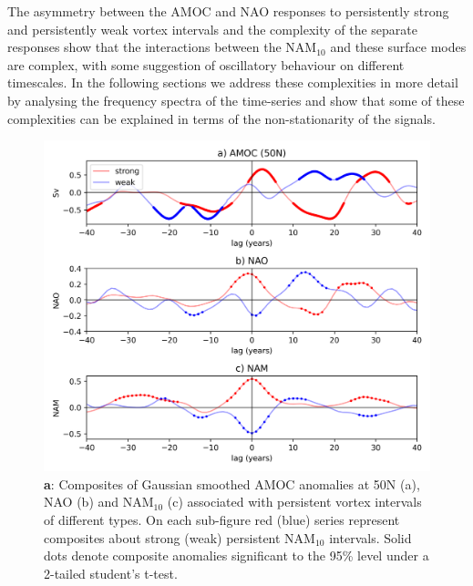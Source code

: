 The asymmetry between the AMOC and NAO responses to persistently strong and persistently weak vortex intervals and the complexity of the separate responses show that the interactions between the NAM$_{10}$ and these surface modes are complex, with some suggestion of oscillatory behaviour on different timescales. In the following sections we address these complexities in more detail by analysing the frequency spectra of the time-series and show that some of these complexities can be explained in terms of the non-stationarity of the signals.

\begin{figure}[h!]
\begin{center}
\noindent\includegraphics[width =\linewidth]{Figures/Figures-surface/AMOC_NAO_NAM_responses_each_event_type.png} 
\caption{\textbf{a}: Composites of Gaussian smoothed AMOC anomalies at 50N (a), NAO (b) and NAM$_{10}$ (c) associated with persistent vortex intervals of different types. On each sub-figure red (blue) series represent composites about strong (weak) persistent NAM$_{10}$ intervals. Solid dots denote composite anomalies significant to the 95\% level under a 2-tailed student's t-test.}
\label{NAO_AMOC_response_individual_types}
\end{center}
\end{figure}

